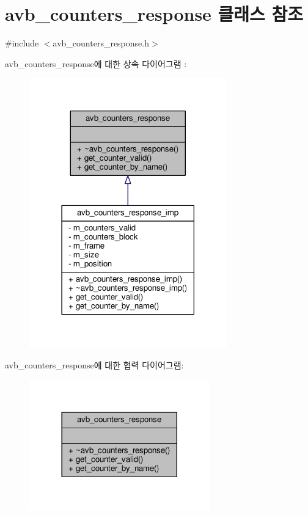 \hypertarget{classavdecc__lib_1_1avb__counters__response}{}\section{avb\+\_\+counters\+\_\+response 클래스 참조}
\label{classavdecc__lib_1_1avb__counters__response}


{\ttfamily \#include $<$avb\+\_\+counters\+\_\+response.\+h$>$}



avb\+\_\+counters\+\_\+response에 대한 상속 다이어그램 \+: 
\nopagebreak
\begin{figure}[H]
\begin{center}
\leavevmode
\includegraphics[width=242pt]{classavdecc__lib_1_1avb__counters__response__inherit__graph}
\end{center}
\end{figure}


avb\+\_\+counters\+\_\+response에 대한 협력 다이어그램\+:
\nopagebreak
\begin{figure}[H]
\begin{center}
\leavevmode
\includegraphics[width=221pt]{classavdecc__lib_1_1avb__counters__response__coll__graph}
\end{center}
\end{figure}
